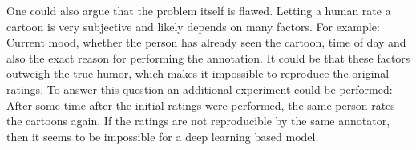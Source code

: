 \documentclass[draft,final,oneside]{vutinfth} %
\begin{document}
One could also argue that the problem itself is flawed. Letting a human rate a
cartoon is very subjective and likely depends on many factors. For example: Current mood, whether the person has already seen the cartoon, time of day and also the exact reason for performing the annotation. It could be that these factors outweigh the true humor, which makes it impossible to reproduce the original ratings. To answer this question an additional experiment could be performed: After some time after the initial ratings were performed, the same person rates the cartoons again. If the ratings are not reproducible by the same annotator, then it seems to be impossible for a deep learning based model.



\backmatter

\listoffigures %








\end{document}

